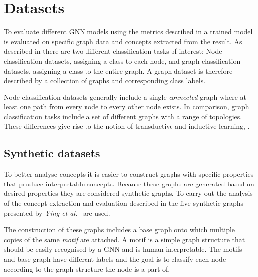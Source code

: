 \section{Datasets}
\label{sec:datasets-theory}


To evaluate different GNN models using the metrics described in  a trained model is evaluated on specific graph data and concepts extracted from the result.
As described in  there are two different classification tasks of interest:
Node classification datasets, assigning a class to each node, and graph classification datasets, assigning a class to the entire graph.
A graph dataset is therefore described by a collection of graphs and corresponding class labels.

Node classification datasets generally include a single \emph{connected} graph where at least one path from every node to every other node exists.
In comparison, graph classification tasks include a set of different graphs with a range of topologies.
These differences give rise to the notion of transductive and inductive learning, .

\subsection{Synthetic datasets}
\label{sec:synth}


To better analyse concepts it is easier to construct graphs with specific properties that produce interpretable concepts.
Because these graphs are generated based on desired properties they are considered synthetic graphs.
To carry out the analysis of the concept extraction and evaluation described in  the five synthetic graphs presented by \textit{Ying et al.}~\cite{ying2019gnnexplainer} are used.

The construction of these graphs includes a base graph onto which multiple copies of the same \emph{motif} are attached.
A motif is a simple graph structure that should be easily recognised by a GNN and is human-interpretable.
The motifs and base graph have different labels and the goal is to classify each node according to the graph structure the node is a part of.

